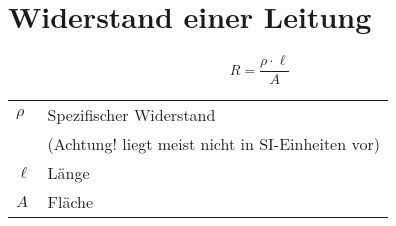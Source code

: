 



\section{Widerstand einer Leitung}
\[ R = \frac{\rho \cdot \ell}{A} \]
\begin{tabular}{lp{4.5cm}}
$\rho$&Spezifischer Widerstand\\
&(Achtung! liegt meist nicht in SI-Einheiten vor)\\
$\ell$&Länge\\
   $A$&Fläche
\end{tabular}
